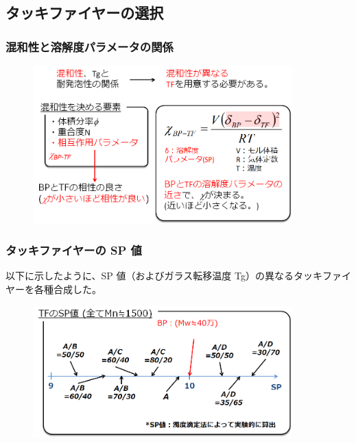 \documentclass[unicode,12pt]{beamer}%
\begin{document}
\subsection{タッキファイヤーの選択}
%
\begin{frame}\frametitle{混和性と溶解度パラメータの関係}
	\begin{figure}
		\begin{center}
			\includegraphics[width=100mm]{konwa.png}
		\end{center}
	\end{figure}
\end{frame}

\begin{frame}\frametitle{タッキファイヤーの SP 値}
	以下に示したように、SP 値（およびガラス転移温度	 Tg）の異なるタッキファイヤーを各種合成した。
		\begin{figure}
			\begin{center}
				\includegraphics[width=100mm]{Tackifier_list.png}
			\end{center}
		\end{figure}
	\end{frame}
	
\end{document}
